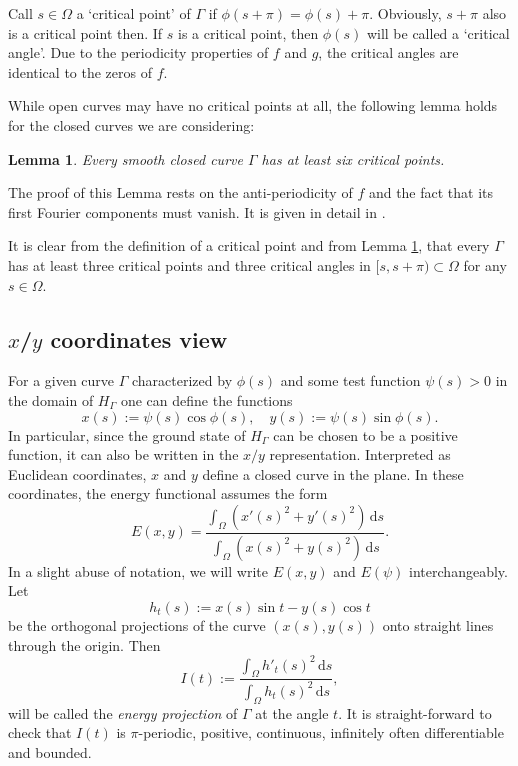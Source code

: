 \documentclass{article}
\newtheorem{lemma}[definition]{Lemma}
\newcommand{\ds}{\,\mathrm{d}s}
\begin{document}
Call $s \in \Omega$ a
`critical point' of $\Gamma$ if $\phi(s + \pi) = \phi(s) + \pi$. Obviously, $s+\pi$ also is a critical point then. If
$s$ is a critical point, then $\phi(s)$ will be called a `critical angle'. Due to the periodicity properties of $f$ and $g$, the critical angles are identical to the zeros of $f$.

While open curves may have no critical points at all,
the following lemma holds for the closed curves we are considering:
\begin{lemma} \label{lem:CriticalPoints}
Every smooth closed curve $\Gamma$ has at least six critical points.
\end{lemma}
The proof of this Lemma rests on the anti-periodicity of $f$ and the fact that its first Fourier components must vanish. It is given in detail in \cite{Linde:ALowerBound}. 

It is clear from the definition of a critical point and from Lemma \ref{lem:CriticalPoints}, that every $\Gamma$ has at least three critical points and three critical angles in $[s,s+\pi) \subset \Omega$ for any $s \in \Omega$. 

\subsection{$x$/$y$ coordinates view} \label{sec:xy_view}

For a given curve $\Gamma$ characterized by $\phi(s)$ and some test function $\psi(s) > 0$ in the domain of $H_\Gamma$ one can define the functions
\begin{equation} \label{eq:def_of_x_and_y}
    x(s) := \psi(s) \cos \phi(s), \quad y(s) := \psi(s) \sin \phi(s).
\end{equation}
In particular, since the ground state of $H_\Gamma$ can be chosen to be a positive function, it can also be written in the $x/y$ representation.
Interpreted as Euclidean coordinates, $x$ and $y$ define a closed curve in the plane. In these coordinates, the energy functional assumes the form
\begin{equation}\label{EqLambda}
    E(x,y) = \frac{\int_\Omega \left(x'(s)^2 + y'(s)^2 \right)\ds}{\int_\Omega \left(x(s)^2 + y(s)^2 \right)\ds}.
\end{equation}
In a slight abuse of notation, we will write $E(x,y)$ and $E(\psi)$ interchangeably.
Let
\begin{equation} \label{eq:def_h}
    h_t(s) :=  x(s) \sin t - y(s) \cos t
\end{equation} 
be the orthogonal projections of the curve $(x(s),y(s))$ onto straight lines through the origin. Then 
\begin{equation} \label{eq:def_I}
    I(t) := \frac{\int_\Omega h'_t(s)^2 \ds}{\int_\Omega h_t(s)^2 \ds},
\end{equation}%
will be called the \emph{energy projection} of $\Gamma$ at the angle $t$. It is straight-forward to check that $I(t)$ is $\pi$-periodic, positive, continuous, infinitely often differentiable and bounded.
\end{document}

